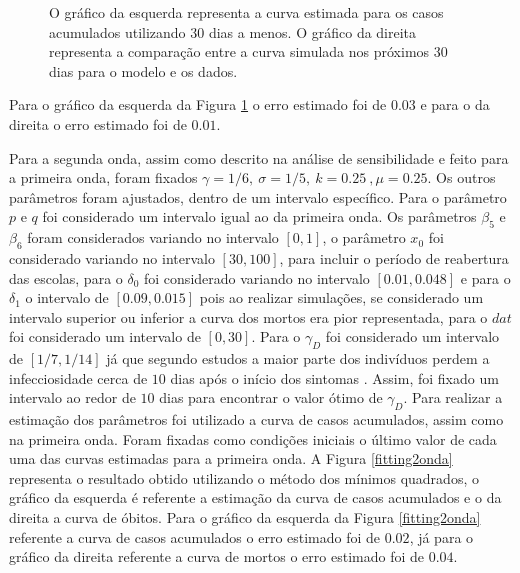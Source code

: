 \documentclass[12pt]{article}
\begin{document}
\begin{figure}[h!]
    \centering
    
    
    \caption{O gráfico da esquerda representa a curva estimada para os casos acumulados utilizando $30$ dias a menos. O gráfico da direita representa a comparação entre a curva simulada nos próximos $30$ dias para o modelo e os dados. }
    \label{comp1onda}
\end{figure}

Para o gráfico da esquerda da Figura \ref{comp1onda} o erro estimado foi de $0.03$ e para o da direita o erro estimado foi de $0.01$.


Para a segunda onda, assim como descrito na análise de sensibilidade e feito para a primeira onda, foram fixados $\gamma = 1/6, \ \sigma = 1/5, \ k = 0.25 \ , \mu = 0.25$. Os outros parâmetros foram ajustados, dentro de um intervalo específico. Para o parâmetro $p$ e $q$ foi considerado um intervalo igual ao da primeira onda. Os parâmetros $\beta_5$ e $\beta_6$ foram considerados variando no intervalo $[0,1]$, o parâmetro $x_0$ foi considerado variando no intervalo $[30,100]$, para incluir o período de reabertura das escolas, para o $\delta_0$ foi considerado variando no intervalo $[0.01,0.048]$ e para o $\delta_1$  o intervalo de $[0.09,0.015]$ pois ao realizar simulações, se considerado um intervalo superior ou inferior a curva dos mortos era pior representada, para o $dat$ foi considerado um intervalo de $[0,30].$ Para o $\gamma_D$ foi considerado um intervalo de $[1/7, 1/14]$ já que segundo estudos a maior parte dos indivíduos perdem a infecciosidade cerca de $10$ dias após o início dos sintomas  \cite{RKI}. Assim, foi fixado um intervalo ao redor de $10$ dias para encontrar o valor ótimo de $\gamma_D$.
Para realizar a estimação dos parâmetros foi utilizado a curva de casos acumulados, assim como na primeira onda. Foram fixadas como condições iniciais o último valor de cada uma das curvas estimadas para a primeira onda. A Figura \ref{fitting2onda} representa o resultado obtido utilizando o método dos mínimos quadrados, o gráfico da esquerda é referente a estimação da curva de casos acumulados e o da direita a curva de óbitos.
Para o gráfico da esquerda da Figura \ref{fitting2onda} referente a curva de casos acumulados o erro estimado foi de $0.02$, já para o gráfico da direita referente a curva de mortos o erro estimado foi de $0.04$.
\end{document}
